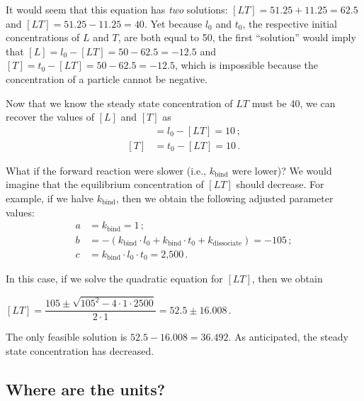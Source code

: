 It would seem that this equation has \textit{two} solutions: $[LT] = 51.25 + 11.25 = 62.5$ and $[LT] = 51.25 - 11.25 = 40$. Yet because $l_0$ and $t_0$, the respective initial concentrations of $L$ and $T$, are both equal to 50, the first ``solution'' would imply that $[L] = l_0 - [LT] = 50 - 62.5 = -12.5$ and $[T] = t_0 - [LT] = 50 - 62.5 = -12.5$, which is impossible because the concentration of a particle cannot be negative. 

Now that we know the steady state concentration of $LT$ must be 40, we can recover the values of $[L]$ and $[T]$ as
\begin{align*}
[L] & = l_0 - [LT] = 10\,;\\
[T] & = t_0 - [LT] = 10\,.
\end{align*}

What if the forward reaction were slower (i.e., $k_\text{bind}$ were lower)? We would imagine that the equilibrium concentration of $[LT]$ should decrease. For example, if we halve $k_\text{bind}$, then we obtain the following adjusted parameter values:
\begin{align*}
a & = k_\text{bind} = 1\,;\\
b & = - (k_\text{bind} \cdot l_0 + k_\text{bind} \cdot t_0 + k_\text{dissociate}) = -105\,;\\
c & = k_\text{bind} \cdot l_0 \cdot t_0 = \text{2,500}\,.
\end{align*}

\noindent In this case, if we solve the quadratic equation for $[LT]$, then we obtain

\begin{center}
$[LT] = \dfrac{105 \pm \sqrt{105^2 - 4 \cdot 1 \cdot 2500}}{2 \cdot 1} = 52.5 \pm 16.008$\,.
\end{center}

\noindent The only feasible solution is $52.5-16.008 = 36.492$. As anticipated, the steady state concentration has decreased.\\

\begin{qbox}\end{qbox}

\FloatBarrier
{}
\subsection{Where are the units?}

